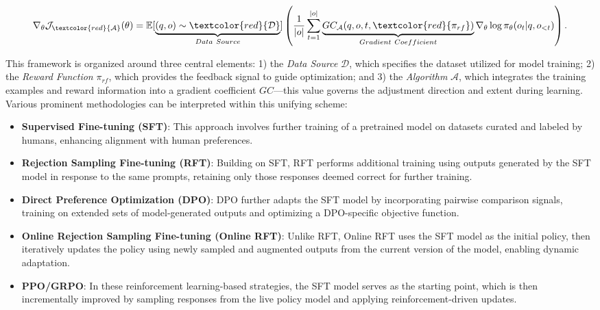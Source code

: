 \begin{equation}
    \nabla_{\theta}\mathcal{J}_{\textcolor{red}{\mathcal{A}}}(\theta) = \mathbb{E}[\underbrace{(q,o) \sim \textcolor{red}{\mathcal{D}}}_{Data \ Source}]\left( \frac{1}{|o|} \sum_{t=1}^{|o|}  \underbrace{GC_{{\mathcal{A}}}(q, o, t, \textcolor{red}{\pi_{{rf}}})}_{Gradient \ Coefficient}  \nabla_{\theta}\log \pi_{\theta}(o_t | q, o_{<t})\right).
\label{eq:objective}
\end{equation}

This framework is organized around three central elements: 1) the \textit{Data Source} $\mathcal{D}$, which specifies the dataset utilized for model training; 2) the \textit{Reward Function} $\pi_{{rf}}$, which provides the feedback signal to guide optimization; and 3) the \textit{Algorithm} $\mathcal{A}$, which integrates the training examples and reward information into a gradient coefficient $GC$—this value governs the adjustment direction and extent during learning. Various prominent methodologies can be interpreted within this unifying scheme:

\begin{itemize}
    \item \textbf{Supervised Fine-tuning (SFT)}: This approach involves further training of a pretrained model on datasets curated and labeled by humans, enhancing alignment with human preferences.
    \item \textbf{Rejection Sampling Fine-tuning (RFT)}: Building on SFT, RFT performs additional training using outputs generated by the SFT model in response to the same prompts, retaining only those responses deemed correct for further training.
    \item \textbf{Direct Preference Optimization (DPO)}: DPO further adapts the SFT model by incorporating pairwise comparison signals, training on extended sets of model-generated outputs and optimizing a DPO-specific objective function.
    \item \textbf{Online Rejection Sampling Fine-tuning (Online RFT)}: Unlike RFT, Online RFT uses the SFT model as the initial policy, then iteratively updates the policy using newly sampled and augmented outputs from the current version of the model, enabling dynamic adaptation.
    \item \textbf{PPO/GRPO}: In these reinforcement learning-based strategies, the SFT model serves as the starting point, which is then incrementally improved by sampling responses from the live policy model and applying reinforcement-driven updates.
\end{itemize}

